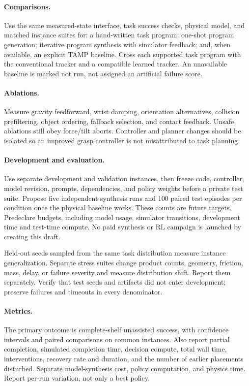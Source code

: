 \paragraph{Comparisons.}
Use the same measured-state interface, task success checks, physical model,
and matched instance suites for: a hand-written task program; one-shot program
generation; iterative program synthesis with simulator feedback; and, when
available, an explicit TAMP baseline. Cross each supported task program with
the conventional tracker and a compatible learned tracker. An unavailable
baseline is marked not run, not assigned an artificial failure score.

\paragraph{Ablations.}
Measure gravity feedforward, wrist damping, orientation alternatives, collision
prefiltering, object ordering, fallback selection, and contact feedback. Unsafe
ablations still obey force/tilt aborts. Controller and planner changes should
be isolated so an improved grasp controller is not misattributed to task planning.

\paragraph{Development and evaluation.}
Use separate development and validation instances, then freeze code, controller,
model revision, prompts, dependencies, and policy weights before a private test
suite. Propose five independent synthesis runs and 100 paired test episodes per
condition once the physical baseline works. These counts are future targets.
Predeclare budgets, including model usage, simulator transitions, development
time and test-time compute. No paid synthesis or RL campaign is launched by
creating this draft.

Held-out seeds sampled from the same task distribution measure instance
generalization. Separate stress suites change product counts, geometry,
friction, mass, delay, or failure severity and measure distribution shift.
Report them separately. Verify that test seeds and artifacts did not enter
development; preserve failures and timeouts in every denominator.

\paragraph{Metrics.}
The primary outcome is complete-shelf unassisted success, with confidence
intervals and paired comparisons on common instances. Also report partial
completion, simulated completion time, decision compute, total wall time,
interventions, recovery rate and duration, and the number of earlier placements
disturbed. Separate model-synthesis cost, policy computation, and physics time.
Report per-run variation, not only a best policy.

